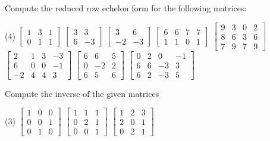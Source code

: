 \begin{exercise}
Compute the reduced row echelon form for the following matrices:
\begin{tasks}(4)
\task
$\begin{bmatrix}
1 & 3 & 1 \\
0 & 1 & 1
\end{bmatrix}$
\task
$\begin{bmatrix}
3 & 3 \\
6 & -3
\end{bmatrix}$
\task
$\begin{bmatrix}
3 & 6 \\
-2 & -3
\end{bmatrix}$
\task
$\begin{bmatrix}
6 & 6 & 7 & 7 \\
1 & 1 & 0 & 1
\end{bmatrix}$
\task
$\begin{bmatrix}
9 & 3 & 0 & 2 \\
8 & 6 & 3 & 6 \\
7 & 9 & 7 & 9
\end{bmatrix}$
\task
$\begin{bmatrix}
2 & 1 & 3 & -3 \\
6 & 0 & 0 & -1 \\
-2 & 4 & 4 & 3
\end{bmatrix}$
\task
$\begin{bmatrix}
6 & 6 & 5 \\
0 & -2 & 2 \\
6 & 5 & 6
\end{bmatrix}$
\task
$\begin{bmatrix}
0 & 2 & 0 & -1 \\
6 & 6 & -3 & 3 \\
6 & 2 & -3 & 5
\end{bmatrix}$
\end{tasks}
\end{exercise}

\begin{exercise}
Compute the inverse of the given matrices
\begin{tasks}(3)
\task
$\begin{bmatrix}
1 & 0 & 0 \\
0 & 0 & 1 \\
0 & 1 & 0
\end{bmatrix}$
\task
$\begin{bmatrix}
1 & 1 & 1 \\
0 & 2 & 1 \\
0 & 0 & 1
\end{bmatrix}$
\task
$\begin{bmatrix}
1 & 2 & 3 \\
2 & 0 & 1 \\
0 & 2 & 1
\end{bmatrix}$
\end{tasks}
\end{exercise}

